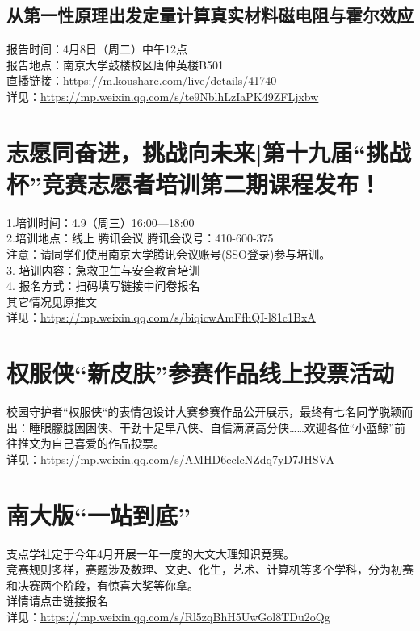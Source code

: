 \documentclass[letterpaper, 12pt]{article}
\begin{document}
\begin{multicols}{2}
\subsection{从第一性原理出发定量计算真实材料磁电阻与霍尔效应}
报告时间：4月8日（周二）中午12点
\\报告地点：南京大学鼓楼校区唐仲英楼B501
\\直播链接：https://m.koushare.com/live/details/41740
\\详见：\url{https://mp.weixin.qq.com/s/te9NblhLzIaPK49ZFLjxbw}

\section{志愿同奋进，挑战向未来|第十九届“挑战杯”竞赛志愿者培训第二期课程发布！}
1.培训时间：4.9（周三）16:00—18:00
\\2.培训地点：线上 腾讯会议 腾讯会议号：410-600-375
\\注意：请同学们使用南京大学腾讯会议账号(SSO登录)参与培训。
\\3. 培训内容：急救卫生与安全教育培训
\\4. 报名方式：扫码填写链接中问卷报名
\\其它情况见原推文
\\详见：\url{https://mp.weixin.qq.com/s/biqicwAmFfhQI-l81c1BxA}
\section{权服侠“新皮肤”参赛作品线上投票活动}
校园守护者“权服侠“的表情包设计大赛参赛作品公开展示，最终有七名同学脱颖而出：睡眼朦胧困困侠、干劲十足早八侠、自信满满高分侠……欢迎各位“小蓝鲸”前往推文为自己喜爱的作品投票。
\\详见：\url{https://mp.weixin.qq.com/s/AMHD6eclcNZdq7yD7JHSVA}
\section{南大版“一站到底”}
支点学社定于今年4月开展一年一度的大文大理知识竞赛。
\\竞赛规则多样，赛题涉及数理、文史、化生，艺术、计算机等多个学科，分为初赛和决赛两个阶段，有惊喜大奖等你拿。
\\详情请点击链接报名
\\详见：\url{https://mp.weixin.qq.com/s/Rl5zqBhH5UwGol8TDu2oQg}

\end{multicols}
\end{document}
